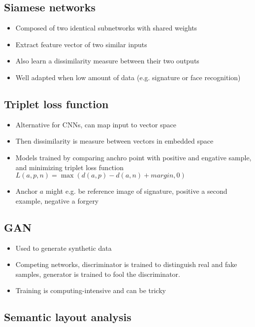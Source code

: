 \subsection{Siamese networks}

\begin{itemize}
		\item Composed of two identical subnetworks with shared weights
		\item Extract feature vector of two similar inputs
		\item Also learn a dissimilarity measure between their two outputs
		\item Well adapted when low amount of data (e.g. signature or face
				recognition)
\end{itemize}

\subsection{Triplet loss function}

\begin{itemize}
		\item Alternative for CNNs, can map input to vector space
		\item Then dissimilarity is measure between vectors in embedded space
		\item Models trained by comparing anchro point with positive and
				engative sample, and minimizing triplet loss function $L(a, p,
				n) = \max(d(a, p) - d(a, n) + margin, 0)$
		\item Anchor $a$ might e.g. be reference image of signature, positive a
				second example, negative a forgery
\end{itemize}

\subsection{GAN}

\begin{itemize}
		\item Used to generate synthetic data
		\item Competing networks, discriminator is trained to distinguish real
				and fake samples, generator is trained to fool the
				discriminator.
		\item Training is computing-intensive and can be tricky
\end{itemize}

\subsection{Semantic layout analysis}

